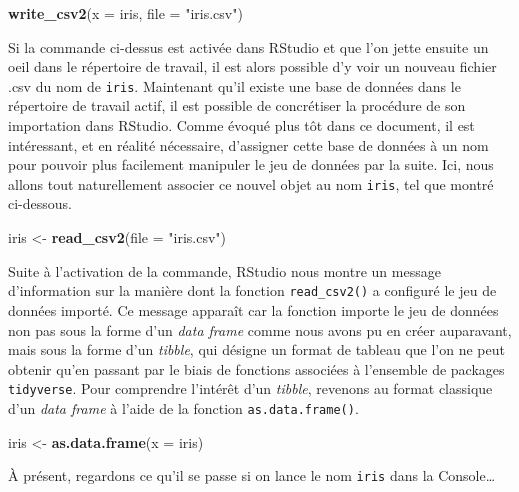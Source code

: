 \documentclass[
  french,
]{book}
\newenvironment{Shaded}{\begin{snugshade}}{\end{snugshade}}
\newcommand{\DataTypeTok}[1]{\textcolor[rgb]{0.13,0.29,0.53}{#1}}
\newcommand{\KeywordTok}[1]{\textcolor[rgb]{0.13,0.29,0.53}{\textbf{#1}}}
\newcommand{\NormalTok}[1]{#1}
\newcommand{\StringTok}[1]{\textcolor[rgb]{0.31,0.60,0.02}{#1}}
\begin{document}
\begin{Shaded}
\begin{Highlighting}[]
\KeywordTok{write_csv2}\NormalTok{(}\DataTypeTok{x =}\NormalTok{ iris, }\DataTypeTok{file =} \StringTok{"iris.csv"}\NormalTok{)}
\end{Highlighting}
\end{Shaded}

Si la commande ci-dessus est activée dans RStudio et que l'on jette ensuite un oeil dans le répertoire de travail, il est alors possible d'y voir un nouveau fichier .csv du nom de \texttt{iris}. Maintenant qu'il existe une base de données dans le répertoire de travail actif, il est possible de concrétiser la procédure de son importation dans RStudio. Comme évoqué plus tôt dans ce document, il est intéressant, et en réalité nécessaire, d'assigner cette base de données à un nom pour pouvoir plus facilement manipuler le jeu de données par la suite. Ici, nous allons tout naturellement associer ce nouvel objet au nom \texttt{iris}, tel que montré ci-dessous.

\begin{Shaded}
\begin{Highlighting}[]
\NormalTok{iris <-}\StringTok{ }\KeywordTok{read_csv2}\NormalTok{(}\DataTypeTok{file =} \StringTok{"iris.csv"}\NormalTok{)}
\end{Highlighting}
\end{Shaded}

Suite à l'activation de la commande, RStudio nous montre un message d'information sur la manière dont la fonction \texttt{read\_csv2()} a configuré le jeu de données importé. Ce message apparaît car la fonction importe le jeu de données non pas sous la forme d'un \emph{data frame} comme nous avons pu en créer auparavant, mais sous la forme d'un \emph{tibble}, qui désigne un format de tableau que l'on ne peut obtenir qu'en passant par le biais de fonctions associées à l'ensemble de packages \texttt{tidyverse}. Pour comprendre l'intérêt d'un \emph{tibble}, revenons au format classique d'un \emph{data frame} à l'aide de la fonction \texttt{as.data.frame()}.

\begin{Shaded}
\begin{Highlighting}[]
\NormalTok{iris <-}\StringTok{ }\KeywordTok{as.data.frame}\NormalTok{(}\DataTypeTok{x =}\NormalTok{ iris)}
\end{Highlighting}
\end{Shaded}

À présent, regardons ce qu'il se passe si on lance le nom \texttt{iris} dans la Console\ldots{}
\end{document}
